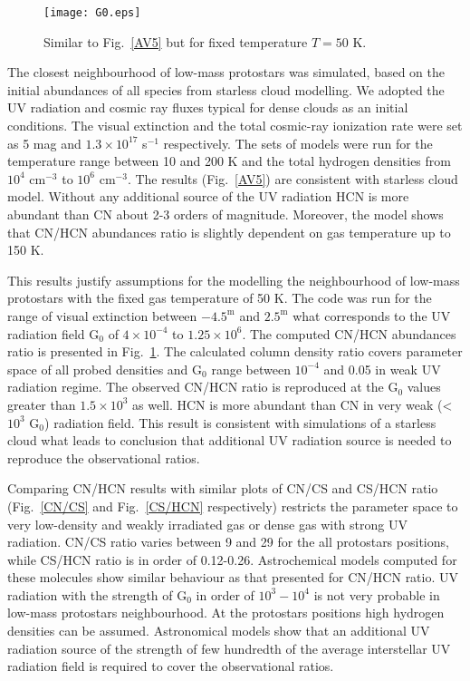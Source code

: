 \documentclass{aa}
\begin{document}
\begin{figure}
\centering
\texttt{[image: G0.eps]}
\caption{Similar to Fig.~\ref{AV5} but for fixed temperature $T = 50$ K.}
\label{G0}
\end{figure}


The closest neighbourhood of low-mass protostars was simulated, based on the initial abundances of all species from starless cloud modelling. We adopted the UV radiation and cosmic ray fluxes typical for dense clouds as an initial conditions. The visual extinction and the total cosmic-ray ionization rate were set as 5 mag and $1.3\times 10^{17}$ s$^{-1}$ respectively. The sets of models were run for the temperature range between 10 and 200 K and the total hydrogen densities from $10^4$ cm$^{-3}$ to $10^6$ cm$^{-3}$. The results (Fig.~\ref{AV5}) are consistent with starless cloud model. Without any additional source of the UV radiation HCN is more abundant than CN about 2-3 orders of magnitude. Moreover, the model shows that CN/HCN abundances ratio is slightly dependent on gas temperature up to 150 K. 

This results justify assumptions for the modelling the neighbourhood of low-mass protostars with the fixed gas temperature of 50 K. The code was run for the range of visual extinction between $-4.5^{\mathrm{m}}$ and $2.5^{\mathrm{m}}$ what corresponds to the UV radiation field G$_0$ of $4\times 10^{-4}$ to $1.25\times 10^{6}$. The computed CN/HCN abundances ratio is presented in Fig.~\ref{G0}. The calculated column density ratio covers parameter space of all probed densities and G$_0$ range between $10^{-4}$ and 0.05 in weak UV radiation regime. The observed CN/HCN ratio is reproduced at the G$_0$ values greater than $1.5 \times 10^{3}$ as well. HCN is more abundant than CN in very weak (<$10^{3}$ G$_0$) radiation field. This result is consistent with simulations of a starless cloud what leads to conclusion that additional UV radiation source is needed to reproduce the observational ratios. 

Comparing CN/HCN results with similar plots of CN/CS and CS/HCN ratio (Fig.~\ref{CN/CS} and Fig.~\ref{CS/HCN} respectively) restricts the parameter space to very low-density and weakly irradiated gas or dense gas with strong UV radiation. CN/CS ratio varies between 9 and 29 for the all protostars positions, while CS/HCN ratio is in order of 0.12-0.26. Astrochemical models computed for these molecules show similar behaviour as that presented for CN/HCN ratio. UV radiation with the strength of G$_0$ in order of $10^{3}-10^{4}$ is not very probable in low-mass protostars neighbourhood. At the protostars positions high hydrogen densities can be assumed. Astronomical models show that an additional UV radiation source of the strength of few hundredth of the average interstellar UV radiation field is required to cover the observational ratios.
\end{document}
